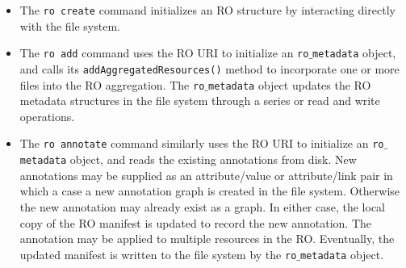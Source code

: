 \begin{itemize}

\item The \texttt{ro create} command initializes an RO structure by interacting directly with the file system.

\item The \texttt{ro add} command uses the RO URI to initialize an \texttt{ro$\_$metadata} object, and calls its \texttt{addAggregatedResources()} method to incorporate one or more files into the RO aggregation. The \texttt{ro$\_$metadata} object updates the RO metadata structures in the file system through a series or read and write operations.

\item The \texttt{ro annotate} command similarly uses the RO URI to initialize an \texttt{ro$\_$metadata} object, and reads the existing annotations from disk. New annotations may be supplied as an attribute/value or attribute/link pair in which a case a new annotation graph is created in the file system. Otherwise the new annotation may already exist as a graph. In either case, the local copy of the RO manifest is updated to record the new annotation. The annotation may be applied to multiple resources in the RO. Eventually, the updated manifest is written to the file system by the \texttt{ro$\_$metadata} object.
\end{itemize}






